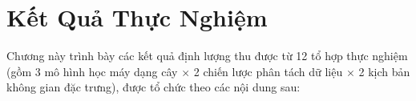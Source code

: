 
\chapter{Kết Quả Thực Nghiệm}
\label{chap:ket_qua}

Chương này trình bày các kết quả định lượng thu được từ 12 tổ hợp thực nghiệm (gồm 3 mô hình học máy dạng cây $\times$ 2 chiến lược phân tách dữ liệu $\times$ 2 kịch bản không gian đặc trưng), được tổ chức theo các nội dung sau:









